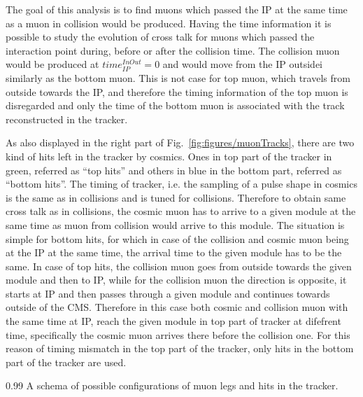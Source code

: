 The goal of this analysis is to find muons which passed the IP at the same time as a muon in collision would be produced. Having the time information it is possible to study the evolution of cross talk for muons which passed the interaction point during, before or after the collision time. The collision muon would be produced at $time_{IP}^{InOut}=0$ and would move from the IP outsidei similarly as the bottom muon. This is not case for top muon, which travels from outside towards the IP, and therefore the timing information of the top muon is disregarded and only the time of the bottom muon is associated with the track reconstructed in the tracker. 

As also displayed in the right part of Fig.~\ref{fig:figures/muonTracks}, there are two kind of hits left in the tracker by cosmics. Ones in top part of the tracker in green, referred as ``top hits'' and others in blue in the bottom part, referred as ``bottom hits''. The timing of tracker, i.e. the sampling of a pulse shape in cosmics is the same as in collisions and is tuned for collisions. Therefore to obtain same cross talk as in collisions, the cosmic muon has to arrive to a given module at the same time as muon from collision would arrive to this module. The situation is simple for bottom hits, for which in case of the collision and cosmic muon being at the IP at the same time, the arrival time to the given module has to be the same. In case of top hits, the collision muon goes from outside towards the given module and then to IP, while for the collision muon the direction is opposite, it starts at IP and then passes through a given module and continues towards outside of the CMS. Therefore in this case both cosmic and collision muon with the same time at IP, reach the given module in top part of tracker at difefrent time, specifically the cosmic muon arrives there before the collision one. For this reason of timing mismatch in the top part of the tracker, only hits in the bottom part of the tracker are used.

                 {0.99}       %
                 { A schema of possible configurations of muon legs and hits in the tracker. }


